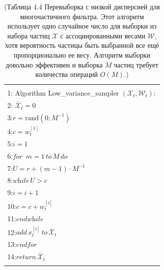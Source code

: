 \documentclass[10pt,a4paper]{article}
\begin{document}
\begin{table}[H]
\begin{center}
\begin{tabular}{|l|}
\hline
{}\\
1: \hspace{3mm} Algorithm Low\_variance\_sampler $(\mathcal X_t,\mathcal W_t):$ \\
2: \hspace{7mm}$\bar{\mathcal X}_t=0$\\
3:\hspace{7mm}$r=\text{rand}(0;M^{-1})$\\
4:\hspace{7mm}$c=w_t^{[1]}$\\
5:\hspace{7mm}$i=1$\\
6:\hspace{7mm}$\textit{for }\,m=1\,\textit{to}\,M\,\textit{do}$\\
7:\hspace{12mm}$U=r+(m-1)\cdot M^{-1}$\\
8:\hspace{12mm}$\textit{while}\,U>c$\\
9:\hspace{17mm}$i=i+1$\\
10:\hspace{15mm}$c=c+w_t^{[i]}$\\
11:\hspace{11mm}$\textit{endwhile}$\\
12:\hspace{11mm}$\textit{add}\,x_t^{[i]}\,\textit{to}\,\bar{\mathcal X}_t$\\
13:\hspace{6mm}$\textit{endfor}$\\
14:\hspace{6mm}$\textit{return}\,\bar{\mathcal X}_t$\\
{}\\
\hline
\end{tabular}
\caption{(Таблица 4.4 Перевыборка с низкой дисперсией для многочастичного фильтра. Этот алгоритм использует одно случайное число для выборки из набора частиц $\mathcal X$ с ассоциированными весами $\mathcal W$, хотя вероятность частицы быть выбранной все ещё пропорционально ее весу. Алгоритм выборки довольно эффективен и выборка $M$ частиц требует количества операций $O(M)$.)}
\end{center}
\end{table}
\end{document}
